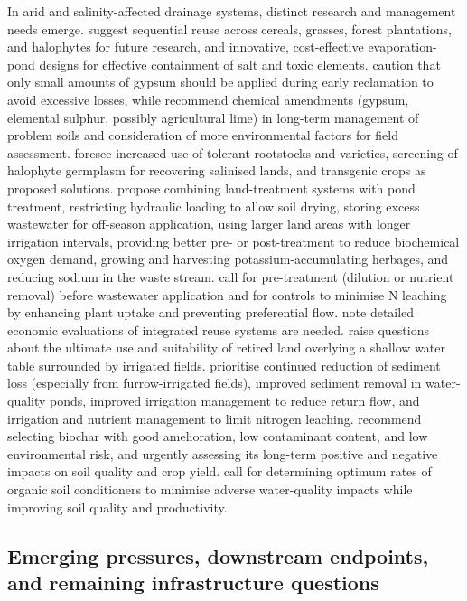 \documentclass[11pt]{article}
\begin{document}
In arid and salinity-affected drainage systems, distinct research and management needs emerge. \textcite{Sharma2004} suggest sequential reuse across cereals, grasses, forest plantations, and halophytes for future research, and innovative, cost-effective evaporation-pond designs for effective containment of salt and toxic elements. \textcite{MANN1982} caution that only small amounts of gypsum should be applied during early reclamation to avoid excessive losses, while \textcite{He2015} recommend chemical amendments (gypsum, elemental sulphur, possibly agricultural lime) in long-term management of problem soils and consideration of more environmental factors for field assessment. \textcite{Cuevas2019} foresee increased use of tolerant rootstocks and varieties, screening of halophyte germplasm for recovering salinised lands, and transgenic crops as proposed solutions. \textcite{Christen2010} propose combining land-treatment systems with pond treatment, restricting hydraulic loading to allow soil drying, storing excess wastewater for off-season application, using larger land areas with longer irrigation intervals, providing better pre- or post-treatment to reduce biochemical oxygen demand, growing and harvesting potassium-accumulating herbages, and reducing sodium in the waste stream. \textcite{Duan2015} call for pre-treatment (dilution or nutrient removal) before wastewater application and for controls to minimise N leaching by enhancing plant uptake and preventing preferential flow. \textcite{Mitchell2000} note detailed economic evaluations of integrated reuse systems are needed. \textcite{Purkey2001} raise questions about the ultimate use and suitability of retired land overlying a shallow water table surrounded by irrigated fields. \textcite{Bjorneberg2020} prioritise continued reduction of sediment loss (especially from furrow-irrigated fields), improved sediment removal in water-quality ponds, improved irrigation management to reduce return flow, and irrigation and nutrient management to limit nitrogen leaching. \textcite{Tian2023b} recommend selecting biochar with good amelioration, low contaminant content, and low environmental risk, and urgently assessing its long-term positive and negative impacts on soil quality and crop yield. \textcite{Zhang2015} call for determining optimum rates of organic soil conditioners to minimise adverse water-quality impacts while improving soil quality and productivity.

\subsection{Emerging pressures, downstream endpoints, and remaining infrastructure questions}
\end{document}
